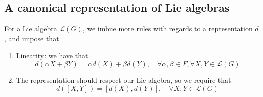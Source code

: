 \subsection{A canonical representation of Lie algebras}    

For a Lie algebra $\mathcal{L}(G)$, we imbue more rules with regards to a representation $d$, and impose that 
\begin{enumerate}
\item Linearity: we have that 
\[
d(\alpha X + \beta Y) = \alpha d(X) + \beta d(Y), \quad \forall \alpha, \beta \in F, \forall X, Y \in \mathcal{L}(G) \] 
\item The representation should respect our Lie algebra, so we require that 
\[ 
d([X, Y]) = [d(X), d(Y)], \quad \forall X, Y \in \mathcal{L}(G)
\]	 
\end{enumerate}
